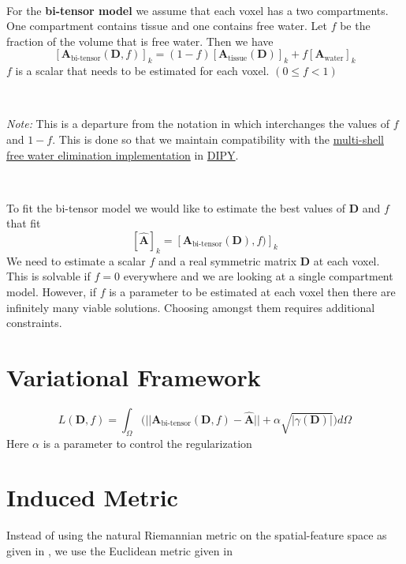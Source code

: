 \documentclass[12pt]{article}
\newcommand{\vect}[1]{\mathbf{#1}}
\newcommand{\Atissue}{\vect{A}_{\text{tissue}}}
\newcommand{\Awater}{\vect{A}_{\text{water}}}
\newcommand{\Abitensor}{\vect{A}_{\text{bi-tensor}}}
\begin{document}
\ 

\noindent
For the \textbf{bi-tensor model} we assume that each voxel has a two
compartments. One compartment contains tissue and one contains free water. Let
$f$ be the fraction of the volume that is free water. Then we have 
$$[\Abitensor(\vect{D},f)]_k = 
  (1-f)[\Atissue(\vect{D})]_k +
  f [\Awater]_k$$
$f$ is a scalar that needs to be estimated for each voxel. $(0 \leq f < 1)$

\ 

\noindent
\textit{Note:} This is a departure from the notation in \cite{Pasternak2009}
which interchanges the values of $f$ and $1-f$. This is done so that we
maintain compatibility with the
\href{http://nipy.org/dipy/examples\_built/reconst\_fwdti.html}{multi-shell
free water elimination implementation} in \href{http://nipy.org/dipy}{DIPY}. 

\ 

\noindent
To fit the bi-tensor model we would like to estimate the best values of
$\vect{D}$ and $f$ that fit $$ [\hat{\vect{A}}]_k =
[\vect{A}_{\text{bi-tensor}}(\vect{D}), f)]_k$$ We need to estimate a scalar
$f$ and a real symmetric matrix $\vect{D}$ at each voxel. This is solvable if
$f=0$ everywhere and we are looking at a single compartment model. However, if
$f$ is a parameter to be estimated at each voxel then there are infinitely many
viable solutions. Choosing amongst them requires additional constraints. 

\section{Variational Framework}


$$L(\vect{D}, f) = \int_\Omega \big( ||\vect{A}_{\text{bi-tensor}}(\vect{D}, f)
- \hat{\vect{A}}|| + \alpha \sqrt{|\gamma(\vect{D})|} \big) d\Omega$$
Here $\alpha$ is a parameter to control the regularization


\section{Induced Metric}

Instead of using the natural Riemannian metric on the spatial-feature space as
given in \cite{Pasternak2009}, we use the Euclidean metric given in
\cite{Pasternak2014} 
\end{document}
